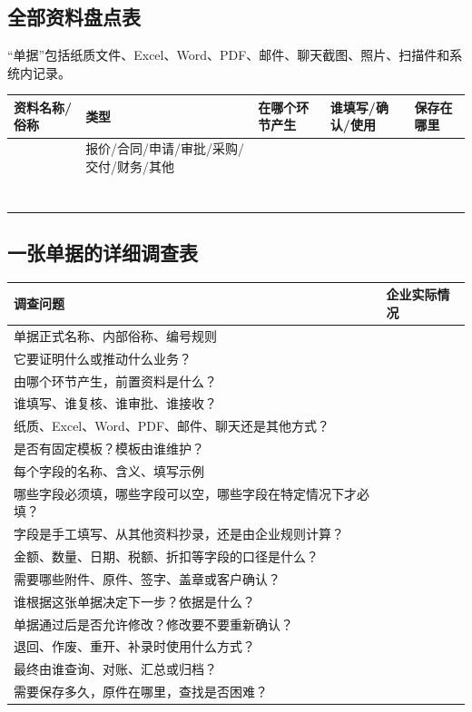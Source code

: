 \documentclass[UTF8,a4paper,11pt]{ctexart}
\begin{document}
\subsection{全部资料盘点表}
“单据”包括纸质文件、Excel、Word、PDF、邮件、聊天截图、照片、扫描件和系统内记录。
\begin{longtable}{p{}p{}p{}p{}p{}}
\toprule
资料名称/俗称 & 类型 & 在哪个环节产生 & 谁填写/确认/使用 & 保存在哪里 \\
\midrule
& 报价/合同/申请/审批/采购/交付/财务/其他 & & & \\
& & & & \\
& & & & \\
& & & & \\
& & & & \\
& & & & \\
& & & & \\
& & & & \\
\bottomrule
\end{longtable}

\subsection{一张单据的详细调查表}
\begin{longtable}{p{}p{}}
\toprule
调查问题 & 企业实际情况 \\
\midrule
单据正式名称、内部俗称、编号规则 & \\
它要证明什么或推动什么业务？ & \\
由哪个环节产生，前置资料是什么？ & \\
谁填写、谁复核、谁审批、谁接收？ & \\
纸质、Excel、Word、PDF、邮件、聊天还是其他方式？ & \\
是否有固定模板？模板由谁维护？ & \\
每个字段的名称、含义、填写示例 & \\
哪些字段必须填，哪些字段可以空，哪些字段在特定情况下才必填？ & \\
字段是手工填写、从其他资料抄录，还是由企业规则计算？ & \\
金额、数量、日期、税额、折扣等字段的口径是什么？ & \\
需要哪些附件、原件、签字、盖章或客户确认？ & \\
谁根据这张单据决定下一步？依据是什么？ & \\
单据通过后是否允许修改？修改要不要重新确认？ & \\
退回、作废、重开、补录时使用什么方式？ & \\
最终由谁查询、对账、汇总或归档？ & \\
需要保存多久，原件在哪里，查找是否困难？ & \\
\bottomrule
\end{longtable}
\end{document}
